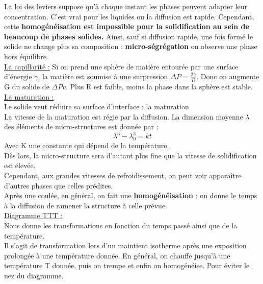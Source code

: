\documentclass[../main.tex]{subfiles}
\begin{document}
La loi des leviers suppose qu'à chaque instant les phases peuvent adapter leur concentration. C'est vrai pour les liquides ou la diffusion est rapide. Cependant, cette \textbf{homogénéisation est impossible pour la solidification au sein de beaucoup de phases solides.} Ainsi, sauf si diffusion rapide, une fois formé le solide ne change plus sa composition : \textbf{micro-ségrégation} on observe une phase hors équilibre.\\

\quad \underline{La capillarité :} Si on prend une sphère de matière entourée par une surface d'énergie $\gamma$, la matière est soumise à une surpression $\Delta P = \frac{2\gamma}{R} $. Donc on augmente G du solide de $\Delta P v$. Plus R est faible, moins la phase dans la sphère est stable.\\

\quad \underline{La maturation :}\\
Le solide veut réduire sa surface d'interface : la maturation\\
La vitesse de la maturation est régie par la diffusion. La dimension moyenne $\lambda$ des éléments de micro-structures est donnée par : \\
\begin{equation}
    \lambda^3-\lambda_0^3 = kt
\end{equation}
Avec K une constante qui dépend de la température.\\
Dès lors, la micro-structure sera d'autant plus fine que la vitesse de solidification est élevée.\\

Cependant, aux grandes vitesses de refroidissement, on peut voir apparaître d'autres phases que celles prédites.\\

Après une coulée, en général, on fait une \textbf{homogénéisation} : on donne le temps à la diffusion de ramener la structure à celle prévue.\\

\quad \underline{Diagramme TTT :}\\
Nous donne les transformations en fonction du temps passé ainsi que de la température.\\
Il s'agit de transformation lors d'un maintient isotherme après une exposition prolongée à une température donnée. En général, on chauffe jusqu'à une température T donnée, puis on trempe et enfin on homogénéise. Pour éviter le nez du diagramme.\\
\end{document}
